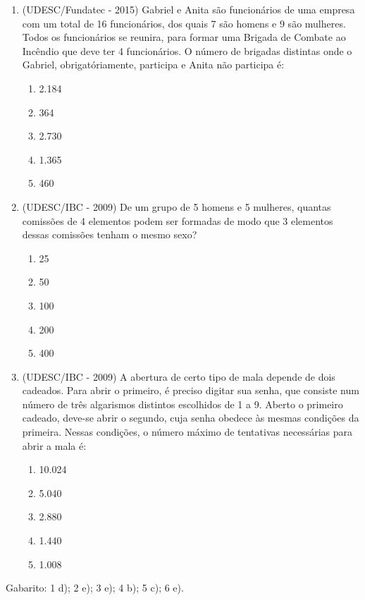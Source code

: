 \begin{enumerate}
 \item (UDESC/Fundatec - 2015) Gabriel e Anita são funcionários de uma empresa com um total de 16 funcionários, dos quais 7 são homens e 9 são mulheres. Todos os funcionários se reunira, para formar uma Brigada de Combate ao Incêndio que deve ter 4 funcionários. O número de brigadas distintas onde o Gabriel, obrigatóriamente, participa e Anita não participa é:
 \begin{enumerate}
 \item 2.184
 \item 364
 \item 2.730
 \item 1.365
 \item 460
 \end{enumerate}

 \item (UDESC/IBC - 2009) De um grupo de 5 homens e 5 mulheres, quantas comissões de 4 elementos podem ser formadas de modo que 3 elementos dessas comissões tenham o mesmo sexo?
 \begin{enumerate}
 \item 25
 \item 50
 \item 100
 \item 200
 \item 400
 \end{enumerate}

 \item (UDESC/IBC - 2009) A abertura de certo tipo de mala depende de dois cadeados. Para abrir o primeiro, é preciso digitar sua senha, que consiste num número de três algarismos distintos escolhidos de 1 a 9. Aberto o primeiro cadeado, deve-se abrir o segundo, cuja senha obedece às mesmas condições da primeira. Nessas condições, o número máximo de tentativas necessárias para abrir a mala é:
 \begin{enumerate}
 \item 10.024
 \item 5.040
 \item 2.880
 \item 1.440
 \item 1.008
 \end{enumerate}


\end{enumerate}
Gabarito: 1 d); 2 e); 3 e); 4 b); 5 c); 6 e).
